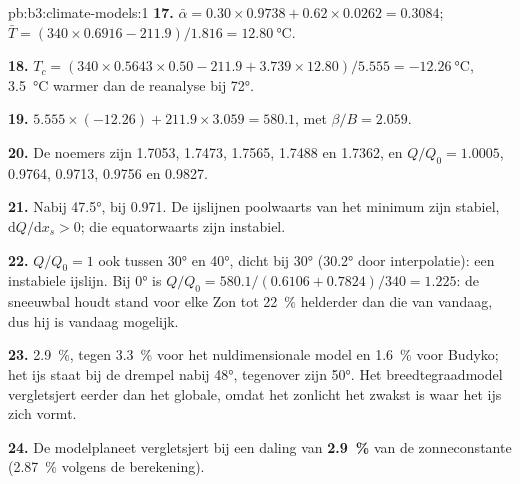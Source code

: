 \begin{solution}{pb:b3:climate-models:1}
\textbf{17.} $\bar\alpha = 0.30\times0.9738 + 0.62\times0.0262 =
\num{0.3084}$; $\bar T = (340\times0.6916 - 211.9)/1.816 =
\qty{12.80}{\celsius}$.

\textbf{18.} $T_c = (340\times0.5643\times0.50 - 211.9 + 3.739\times12.80)/
5.555 = \qty{-12.26}{\celsius}$, \qty{3.5}{\celsius} warmer dan de
reanalyse bij \ang{72}.

\textbf{19.} $5.555\times(-12.26) + 211.9\times3.059 = \num{580.1}$, met
$\beta/B = \num{2.059}$.

\textbf{20.} De noemers zijn 1.7053, 1.7473, 1.7565, 1.7488 en
1.7362, en $Q/Q_0 = \num{1.0005}$, \num{0.9764}, \num{0.9713},
\num{0.9756} en \num{0.9827}.

\textbf{21.} Nabij \ang{47.5}, bij \num{0.971}. De ijslijnen poolwaarts van het
minimum zijn stabiel, $\mathrm dQ/\mathrm dx_s > 0$; die equatorwaarts zijn
instabiel.

\textbf{22.} $Q/Q_0 = 1$ ook tussen \ang{30} en \ang{40}, dicht bij
\ang{30} (\ang{30.2} door interpolatie): een instabiele ijslijn. Bij \ang{0}
is $Q/Q_0 = 580.1/(0.6106 + 0.7824)/340 = \num{1.225}$: de sneeuwbal houdt
stand voor elke Zon tot \qty{22}{\percent} helderder dan die van vandaag, dus
hij is vandaag mogelijk.

\textbf{23.} \qty{2.9}{\percent}, tegen \qty{3.3}{\percent} voor het
nuldimensionale model en \qty{1.6}{\percent} voor Budyko; het ijs staat
bij de drempel nabij \ang{48}, tegenover zijn \ang{50}. Het breedtegraadmodel
vergletsjert eerder dan het globale, omdat het zonlicht het zwakst is waar
het ijs zich vormt.

\textbf{24.} De modelplaneet vergletsjert bij een daling van
\textbf{\qty[text-series-to-math=true]{2.9}{\percent}} van de
zonneconstante (\qty{2.87}{\percent} volgens de berekening).
\end{solution}
